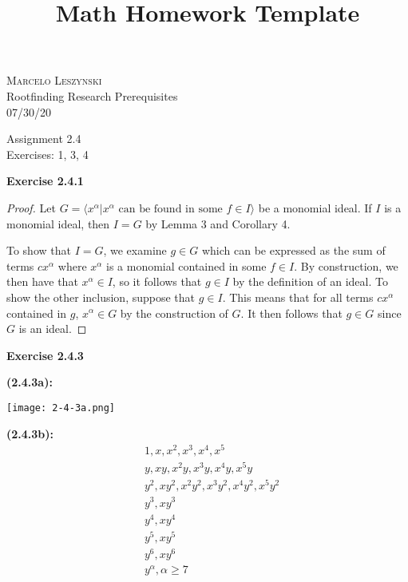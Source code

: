 \documentclass[12pt,oneside]{article}
\newenvironment{exercise}[1]{\vspace{.1in}\noindent\textbf{Exercise #1 \hspace{.05em}}}{}
\begin{document}
\title{Math Homework Template}

\begin{flushright}
\textsc{Marcelo Leszynski}  \\
Rootfinding Research Prerequisites\\
07/30/20
\end{flushright}

\begin{center}
\textsf{Assignment 2.4 } \\
\textsf{Exercises: 1, 3, 4 }
\end{center}


\begin{exercise}{2.4.1}
    \begin{proof}
        Let $G = \langle x^\alpha | x^\alpha \text{ can be found in some }f \in I\rangle$
        be a monomial ideal. If $I$ is a monomial ideal, then $I=G$ by Lemma 3 
        and Corollary 4. 

        To show that $I=G$, we examine $g \in G$ which can be expressed as the 
        sum of terms $cx^\alpha$ where $x^\alpha$ is a monomial contained in some 
        $f \in I$. By construction, we then have that $x^\alpha \in I$, so it follows 
        that $g \in I$ by the definition of an ideal. To show the other inclusion, 
        suppose that $g \in I$. This means that for all terms $cx^\alpha$ contained 
        in $g$, $x^\alpha \in G$ by the construction of $G$. It then follows that 
        $g \in G$ since $G$ is an ideal. 
    \end{proof}
\end{exercise}


\begin{exercise}{2.4.3}

    \bigskip
    \textbf{(2.4.3a):}

    \texttt{[image: 2-4-3a.png]}

    \bigskip
    \textbf{(2.4.3b):}
    \begin{align*}
        &1,x,x^2,x^3,x^4,x^5\\
        &y,xy,x^2y,x^3y,x^4y,x^5y\\
        &y^2,xy^2,x^2y^2,x^3y^2,x^4y^2,x^5y^2\\
        &y^3,xy^3\\
        &y^4,xy^4\\
        &y^5,xy^5\\
        &y^6,xy^6\\
        &y^\alpha, \alpha \geq 7
    \end{align*}
\end{exercise}
\end{document}
